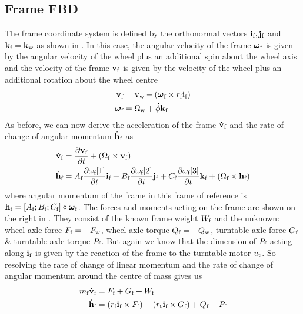 \subsection{Frame FBD}
The frame coordinate system is defined by the orthonormal vectors $\mathbf{i}_{\text{f}},\mathbf{j}_{\text{f}}$ and $\mathbf{k}_{\text{f}}=\mathbf{k}_{\text{w}}$ as shown in . In this case, the angular velocity of the frame $\boldsymbol{\omega}_{\text{f}}$ is given by the angular velocity of the wheel plus an additional spin about the wheel axis and the velocity of the frame $\mathbf{v}_{\text{f}}$ is given by the velocity of the wheel plus an additional rotation about the wheel centre
\begin{align*}
\mathbf{v}_{\text{f}} &= \mathbf{v}_{\text{w}} -(\boldsymbol{\omega}_{\text{f}}\times r_{\text{f}}\mathbf{i}_{\text{f}}) \\
\boldsymbol{\omega}_{\text{f}} &= \Omega_{\text{w}} + \dot\phi\mathbf{k}_{\text{f}}
\end{align*}
As before, we can now derive the acceleration of the frame $\dot{\mathbf{v}}_{\text{f}}$ and the rate of change of angular momentum $\dot{\mathbf{h}}_{\text{f}}$ as
\begin{align*}
\dot{\mathbf{v}}_{\text{f}} &= \frac{\mathrm{\partial} \mathbf{v}_{\text{f}}}{\mathrm{\partial} t} + (\Omega_{\text{f}}\times \mathbf{v}_{\text{f}}) \\
\dot{\mathbf{h}}_{\text{f}} &= A_{\text{f}}\frac{\mathrm{\partial} \omega_{\text{f}}[1]}{\mathrm{\partial} t}\mathbf{i}_{\text{f}} + B_{\text{f}}\frac{\mathrm{\partial} \omega_{\text{f}}[2]}{\mathrm{\partial} t}\mathbf{j}_{\text{f}} + C_{\text{f}}\frac{\mathrm{\partial} \omega_{\text{f}}[3]}{\mathrm{\partial} t}\mathbf{k}_{\text{f}} +  (\Omega_{\text{f}}\times \mathbf{h}_{\text{f}})
\end{align*}
where angular momentum of the frame in this frame of reference is $\mathbf{h}_{\text{f}} = [A_{\text{f}}; B_{\text{f}}; C_{\text{f}}] \circ \boldsymbol{\omega}_{\text{f}}$. The forces and moments acting on the frame are shown on the right in . They consist of the known frame weight $W_{\text{f}}$ and the unknown: wheel axle force $F_{\text{f}}=-F_{\text{w}}$, wheel axle torque $Q_{\text{f}}=-Q_{\text{w}}$, turntable axle force $G_{\text{f}}$ \& turntable axle torque $P_{\text{f}}$. But again we know that the dimension of $P_{\text{f}}$ acting along $\mathbf{i}_{\text{f}}$ is given by the reaction of the frame to the turntable motor $u_{\text{t}}$.  So resolving the rate of change of linear momentum and the rate of change of angular momentum around the centre of mass gives us
\begin{align}
m_{\text{f}}\dot{\mathbf{v}}_{\text{f}} &= F_{\text{f}} + G_{\text{f}} + W_{\text{f}} \label{eqn:fFBD1} \\
\dot{\mathbf{h}}_{\text{f}} &= (r_{\text{f}}\mathbf{i}_{\text{f}} \times F_{\text{f}}) - (r_{\text{t}}\mathbf{i}_{\text{f}} \times G_{\text{f}}) + Q_{\text{f}} + P_{\text{f}} \label{eqn:fFBD2} 
\end{align}


